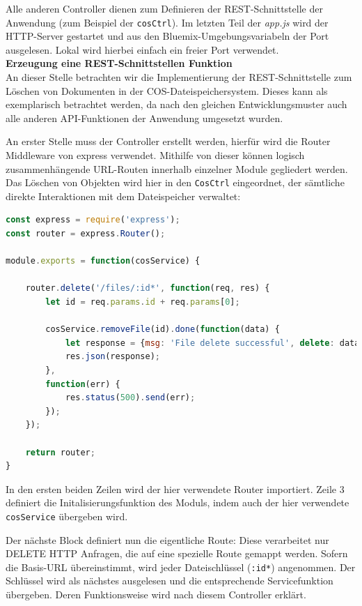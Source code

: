 Alle anderen Controller dienen zum Definieren der REST-Schnittstelle der Anwendung (zum Beispiel der \lstinline|cosCtrl|). Im letzten Teil der \textit{app.js} wird der HTTP-Server gestartet und aus den Bluemix-Umgebungsvariabeln der Port ausgelesen. Lokal wird hierbei einfach ein freier Port verwendet.\\

\textbf{Erzeugung eine REST-Schnittstellen Funktion}\\
An dieser Stelle betrachten wir die Implementierung der REST-Schnittstelle zum Löschen von Dokumenten in der \ac{COS}-Dateispeichersystem. Dieses kann als exemplarisch betrachtet werden, da nach den gleichen Entwicklungsmuster auch alle anderen API-Funktionen der Anwendung umgesetzt wurden. 

An erster Stelle muss der Controller erstellt werden, hierfür wird die Router Middleware von express verwendet. Mithilfe von dieser können logisch zusammenhängende URL-Routen innerhalb einzelner Module gegliedert werden. Das Löschen von Objekten wird hier in den \lstinline|CosCtrl| eingeordnet, der sämtliche direkte Interaktionen mit dem Dateispeicher verwaltet:\\

\begin{lstlisting}[language=JavaScript, caption=CosCtrl.js mit einer Route zur Dateilöschung]
const express = require('express');
const router = express.Router();

module.exports = function(cosService) {

	router.delete('/files/:id*', function(req, res) {
		let id = req.params.id + req.params[0];

		cosService.removeFile(id).done(function(data) {
			let response = {msg: 'File delete successful', delete: data};
			res.json(response);
		},
		function(err) {
			res.status(500).send(err);
		});
	});

	return router;
}
\end{lstlisting}

In den ersten beiden Zeilen wird der hier verwendete Router importiert. Zeile 3 definiert die Initalisierungsfunktion des Moduls, indem auch der hier verwendete \lstinline|cosService| übergeben wird.

Der nächste Block definiert nun die eigentliche Route: Diese verarbeitet nur DELETE HTTP Anfragen, die auf eine spezielle Route gemappt werden. Sofern die Basis-URL übereinstimmt, wird jeder Dateischlüssel (\lstinline|:id*|) angenommen. Der Schlüssel wird als nächstes ausgelesen und die entsprechende Servicefunktion übergeben. Deren Funktionsweise wird nach diesem Controller erklärt.

